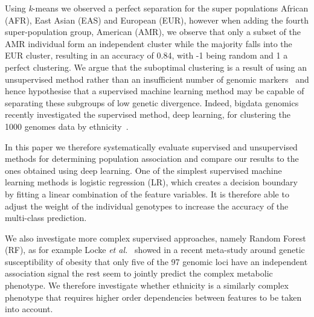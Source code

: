 \documentclass{llncs}
\newcommand{\kMeans}{\textit{k}-means}
\begin{document}
{Using \kMeans{} we observed a perfect separation for the super populations African (AFR), East Asian (EAS) and European
(EUR), however when adding the fourth super-population group, American (AMR), we observe that only a subset of the AMR
individual form an independent cluster while the majority falls into the EUR cluster, resulting in an accuracy of 0.84,
with -1 being random and 1 a perfect clustering.  We argue that the suboptimal clustering is a result of using an
unsupervised method rather than an insufficient number of genomic markers~\cite{Patterson2006} and hence hypothesise
that a supervised machine learning method may be capable of separating these subgroups of low genetic divergence.
Indeed, bigdata genomics recently investigated the supervised method, deep learning, for clustering the 1000 genomes
data by ethnicity~\cite{Ferguson}.

In this paper we therefore systematically evaluate supervised and unsupervised methods for determining population
association and compare our results to the ones obtained using deep learning.
One of the simplest supervised machine learning methods is logistic regression (LR), which creates a decision boundary
by fitting a linear combination of the feature variables.  It is therefore able to adjust the weight of the individual
genotypes to increase the accuracy of the multi-class prediction.


 
  We also investigate more complex supervised
approaches, namely Random Forest (RF), as for example Locke {\it et al.}~\cite{Locke2015} showed in a recent meta-study
around genetic susceptibility of obesity that only five of the 97 genomic loci have an independent association signal
the rest seem to jointly predict the complex metabolic phenotype.  We therefore investigate whether ethnicity is a
similarly complex phenotype that requires higher order dependencies between features to be taken into
account. %

}
\end{document}
